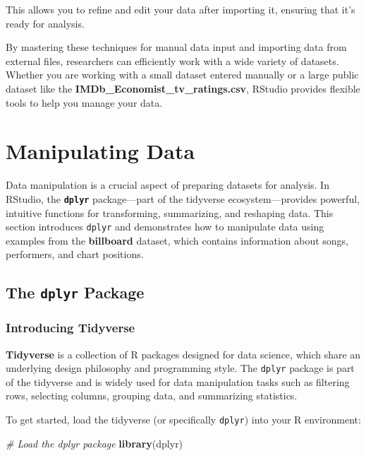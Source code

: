 \documentclass[
]{book}
\newenvironment{Shaded}{\begin{snugshade}}{\end{snugshade}}
\newcommand{\CommentTok}[1]{\textcolor[rgb]{0.56,0.35,0.01}{\textit{#1}}}
\newcommand{\FunctionTok}[1]{\textcolor[rgb]{0.13,0.29,0.53}{\textbf{#1}}}
\newcommand{\NormalTok}[1]{#1}
\begin{document}
This allows you to refine and edit your data after importing it, ensuring that it's ready for analysis.

By mastering these techniques for manual data input and importing data from external files, researchers can efficiently work with a wide variety of datasets. Whether you are working with a small dataset entered manually or a large public dataset like the \textbf{IMDb\_Economist\_tv\_ratings.csv}, RStudio provides flexible tools to help you manage your data.

\section{Manipulating Data}\label{manipulating-data}

Data manipulation is a crucial aspect of preparing datasets for analysis. In RStudio, the \textbf{\texttt{dplyr}} package---part of the tidyverse ecosystem---provides powerful, intuitive functions for transforming, summarizing, and reshaping data. This section introduces \texttt{dplyr} and demonstrates how to manipulate data using examples from the \textbf{billboard} dataset, which contains information about songs, performers, and chart positions.

\subsection*{\texorpdfstring{The \texttt{dplyr} Package}{The dplyr Package}}\label{the-dplyr-package}

\subsubsection*{Introducing Tidyverse}\label{introducing-tidyverse}

\textbf{Tidyverse} is a collection of R packages designed for data science, which share an underlying design philosophy and programming style. The \texttt{dplyr} package is part of the tidyverse and is widely used for data manipulation tasks such as filtering rows, selecting columns, grouping data, and summarizing statistics.

To get started, load the tidyverse (or specifically \texttt{dplyr}) into your R environment:

\begin{Shaded}
\begin{Highlighting}[]
\CommentTok{\# Load the dplyr package}
\FunctionTok{library}\NormalTok{(dplyr)}
\end{Highlighting}
\end{Shaded}
\end{document}
